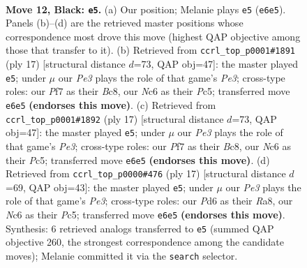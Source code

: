 \documentclass[11pt]{article}
\begin{document}
\clearpage

\begin{figure}[p]\centering
\begin{subfigure}{0.46\textwidth}\centering
\resizebox{\linewidth}{!}{%
\newchessgame
\chessboard[
  setfen={r1b1rk2/ppp1qpp1/2nppn1p/P6P/2PP4/2P1PNP1/3B1P2/R2QKB1R b KQ - 0 12},
  showmover=false,
  pgfstyle=straightmove, color=movearrow, markmove={e6-e5}
]}
\caption{}
\end{subfigure}\hfill
\begin{subfigure}{0.46\textwidth}\centering
\resizebox{\linewidth}{!}{%
\newchessgame
\chessboard[
  setfen={r1bq1rk1/pp3ppp/2nppn2/2p5/2PPP3/2PB1N2/P4PPP/R1BQ1RK1 b - - 0 9},
  showmover=false,
  pgfstyle=straightmove, color=movearrow, markmove={e6-e5}
]}
\caption{}
\end{subfigure}
\\[4pt]
\begin{subfigure}{0.46\textwidth}\centering
\resizebox{\linewidth}{!}{%
\newchessgame
\chessboard[
  setfen={r1bq1rk1/pp3ppp/2nppn2/2p5/2PPP3/2PB1N2/P4PPP/R1BQ1RK1 b - - 0 9},
  showmover=false,
  pgfstyle=straightmove, color=movearrow, markmove={e6-e5}
]}
\caption{}
\end{subfigure}\hfill
\begin{subfigure}{0.46\textwidth}\centering
\resizebox{\linewidth}{!}{%
\newchessgame
\chessboard[
  setfen={r1bq1rk1/pp3ppp/2nppn2/2p5/2PPP3/P1PB4/4NPPP/R1BQK2R b KQ - 1 9},
  showmover=false,
  pgfstyle=straightmove, color=movearrow, markmove={e6-e5}
]}
\caption{}
\end{subfigure}
\caption{\textbf{Move 12, Black: \texttt{e5}.} (a) Our position; Melanie plays \texttt{e5} (\texttt{e6e5}). Panels (b)--(d) are the retrieved master positions whose correspondence most drove this move (highest QAP objective among those that transfer to it). (b) Retrieved from \texttt{ccrl\_top\_p0001\#1891} (ply 17) [structural distance $d$=73, QAP obj=47]: the master played \texttt{e5}; under $\mu$ our \emph{Pe3} plays the role of that game's \emph{Pe3}; cross-type roles: our \emph{P}f7 as their \emph{B}c8, our \emph{N}c6 as their \emph{P}c5; transferred move \texttt{e6e5} \textbf{(endorses this move)}. (c) Retrieved from \texttt{ccrl\_top\_p0001\#1892} (ply 17) [structural distance $d$=73, QAP obj=47]: the master played \texttt{e5}; under $\mu$ our \emph{Pe3} plays the role of that game's \emph{Pe3}; cross-type roles: our \emph{P}f7 as their \emph{B}c8, our \emph{N}c6 as their \emph{P}c5; transferred move \texttt{e6e5} \textbf{(endorses this move)}. (d) Retrieved from \texttt{ccrl\_top\_p0000\#476} (ply 17) [structural distance $d$=69, QAP obj=43]: the master played \texttt{e5}; under $\mu$ our \emph{Pe3} plays the role of that game's \emph{Pe3}; cross-type roles: our \emph{P}d6 as their \emph{R}a8, our \emph{N}c6 as their \emph{P}c5; transferred move \texttt{e6e5} \textbf{(endorses this move)}. Synthesis: 6 retrieved analogs transferred to \texttt{e5} (summed QAP objective 260, the strongest correspondence among the candidate moves); Melanie committed it via the \texttt{search} selector.}
\label{fig:thought-m23}
\end{figure}
\end{document}
